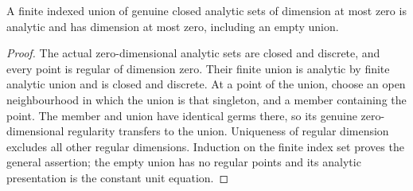 \begin{lemma}
\label{hir:dimtwo-finite-dimzero-union}
\leanok
A finite indexed union of genuine closed analytic sets of dimension at
most zero is analytic and has dimension at most zero, including an empty union.
\end{lemma}
\begin{proof}
The actual zero-dimensional analytic sets are closed and discrete, and
every point is regular of dimension zero. Their finite union is analytic
by finite analytic union and is closed and discrete. At a point of the
union, choose an open neighbourhood in which the union is that singleton,
and a member containing the point. The member and union have identical
germs there, so its genuine zero-dimensional regularity transfers to the
union. Uniqueness of regular dimension excludes all other regular dimensions.
Induction on the finite index set proves the general assertion; the empty
union has no regular points and its analytic presentation is the constant
unit equation.
\end{proof}

